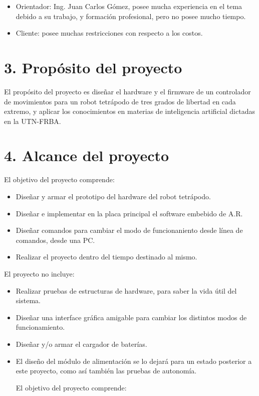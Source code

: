 \documentclass[
11pt, %
codirector, %
]{charter}
\begin{document}
\begin{itemize}
\item Orientador: Ing. Juan Carlos Gómez, posee mucha experiencia en el tema debido a su trabajo, y formación  profesional, pero no posee mucho tiempo.
\item Cliente: posee muchas restricciones con respecto a los costos.
\end{itemize}


\section{3. Propósito del proyecto}
\label{sec:proposito}

El propósito del proyecto es diseñar el hardware y el firmware de un controlador de movimientos para un robot tetrápodo de tres grados de libertad en cada extremo, y aplicar los conocimientos en materias de inteligencia artificial dictadas en la UTN-FRBA.


\section{4. Alcance del proyecto}
\label{sec:alcance}

El objetivo del proyecto comprende:

\begin{itemize}
\item Diseñar y armar el prototipo del hardware del robot tetrápodo.
\item Diseñar e implementar en la placa principal el software embebido de A.R.
\item Diseñar comandos para cambiar el modo de funcionaniento desde línea de comandos, desde una PC. 
\item Realizar el proyecto dentro del tiempo destinado al mismo.
\end{itemize}

El proyecto no incluye:

\begin{itemize}
\item Realizar pruebas de estructuras de hardware, para saber la vida útil del sistema.
\item Diseñar una interface gráfica amigable para cambiar los distintos modos de funcionamiento.
\item Diseñar y/o armar el cargador de baterías.
\item El diseño del módulo de alimentación se lo dejará para un estado posterior a este proyecto, como así también las pruebas de autonomía.

El objetivo del proyecto comprende:


\end{itemize}
\end{document}

